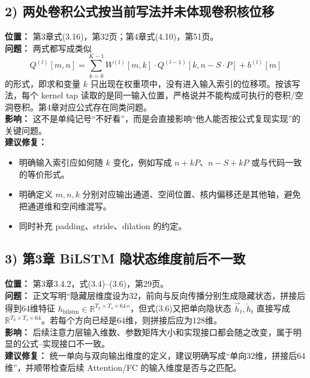 \documentclass[12pt]{ctexart}
\begin{document}
\subsection*{2) 两处卷积公式按当前写法并未体现卷积核位移}
\textbf{位置：} 第3章式(3.16)，第32页；第4章式(4.10)，第51页。\\
\textbf{问题：} 两式都写成类似
\[
Q^{(l)}[m,n]=\sum_{k=0}^{K-1}W^{(l)}[m,k]\cdot Q^{(l-1)}[k,n-S\cdot P]+b^{(l)}[m]
\]
的形式，即求和变量 \(k\) 只出现在权重项中，没有进入输入索引的位移项。按该写法，每个 kernel tap 读取的是同一输入位置，严格说并不能构成可执行的卷积/空洞卷积。第4章对应公式存在同类问题。\\
\textbf{影响：} 这不是单纯记号“不好看”，而是会直接影响“他人能否按公式复现实现”的关键问题。\\
\textbf{建议修复：}
\begin{itemize}
  \item 明确输入索引应如何随 \(k\) 变化，例如写成 \(n+kP\)、\(n-S+kP\) 或与代码一致的等价形式。
  \item 明确定义 \(m,n,k\) 分别对应输出通道、空间位置、核内偏移还是其他轴，避免把通道维和空间维混写。
  \item 同时补充 padding、stride、dilation 的约定。
\end{itemize}

\subsection*{3) 第3章 BiLSTM 隐状态维度前后不一致}
\textbf{位置：} 第3章3.4.2，式(3.4)--(3.6)，第29页。\\
\textbf{问题：} 正文写明“隐藏层维度设为32，前向与反向传播分别生成隐藏状态，拼接后得到64维特征 \(h_{\mathrm{bilstm}}\in\mathbb{R}^{T_k\times T_s\times 64}\)”，但式(3.6)又把单向隐状态 \(\overrightarrow h_t,\overleftarrow h_t\) 直接写成 \(\mathbb{R}^{T_k\times T_s\times 64}\)。若每个方向已经是64维，则拼接后应为128维。\\
\textbf{影响：} 后续注意力层输入维数、参数矩阵大小和实现接口都会随之改变，属于明显的公式--实现接口不一致。\\
\textbf{建议修复：} 统一单向与双向输出维度的定义，建议明确写成“单向32维，拼接后64维”，并顺带检查后续 Attention/FC 的输入维度是否与之匹配。
\end{document}
